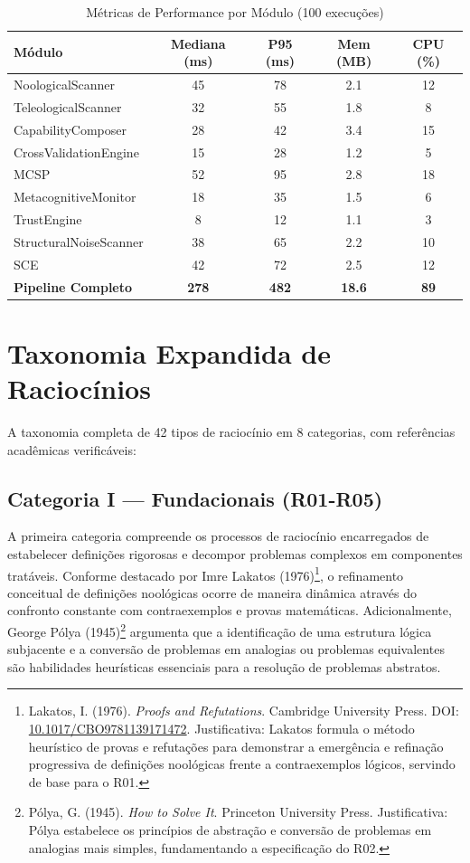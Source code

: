 \documentclass[12pt,a4paper,oneside]{abntex2}
\begin{document}
\begin{apendicesenv}
\begin{table}[H]
\centering
\small
\caption{Métricas de Performance por Módulo (100 execuções)}
\begin{tabular}{lcccc}
\toprule
\textbf{Módulo} & \textbf{Mediana (ms)} & \textbf{P95 (ms)} & \textbf{Mem (MB)} & \textbf{CPU (\%)} \\
\midrule
NoologicalScanner & 45 & 78 & 2.1 & 12 \\
TeleologicalScanner & 32 & 55 & 1.8 & 8 \\
CapabilityComposer & 28 & 42 & 3.4 & 15 \\
CrossValidationEngine & 15 & 28 & 1.2 & 5 \\
MCSP & 52 & 95 & 2.8 & 18 \\
MetacognitiveMonitor & 18 & 35 & 1.5 & 6 \\
TrustEngine & 8 & 12 & 1.1 & 3 \\
StructuralNoiseScanner & 38 & 65 & 2.2 & 10 \\
SCE & 42 & 72 & 2.5 & 12 \\
\midrule
\textbf{Pipeline Completo} & \textbf{278} & \textbf{482} & \textbf{18.6} & \textbf{89} \\
\bottomrule
\end{tabular}
\end{table}

\chapter{Taxonomia Expandida de Raciocínios}

A taxonomia completa de 42 tipos de raciocínio em 8 categorias, com referências acadêmicas verificáveis:

\section{Categoria I — Fundacionais (R01-R05)}

A primeira categoria compreende os processos de raciocínio encarregados de estabelecer definições rigorosas e decompor problemas complexos em componentes tratáveis. Conforme destacado por Imre Lakatos (1976)\footnote{Lakatos, I. (1976). \textit{Proofs and Refutations}. Cambridge University Press. DOI: \href{https://doi.org/10.1017/CBO9781139171472}{10.1017/CBO9781139171472}. Justificativa: Lakatos formula o método heurístico de provas e refutações para demonstrar a emergência e refinação progressiva de definições noológicas frente a contraexemplos lógicos, servindo de base para o R01.}, o refinamento conceitual de definições noológicas ocorre de maneira dinâmica através do confronto constante com contraexemplos e provas matemáticas. Adicionalmente, George Pólya (1945)\footnote{Pólya, G. (1945). \textit{How to Solve It}. Princeton University Press. Justificativa: Pólya estabelece os princípios de abstração e conversão de problemas em analogias mais simples, fundamentando a especificação do R02.} argumenta que a identificação de uma estrutura lógica subjacente e a conversão de problemas em analogias ou problemas equivalentes são habilidades heurísticas essenciais para a resolução de problemas abstratos.


\end{apendicesenv}
\end{document}
